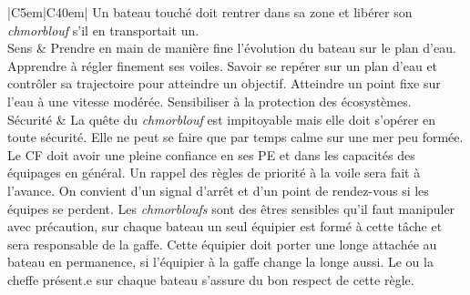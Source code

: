 \begin{center}
\begin{tabular}{|C{5em}|C{40em}|}
Un bateau touché doit rentrer dans sa zone et libérer son \textit{chmorblouf} s'il en transportait un. 
 \\
\hline
Sens & Prendre en main de manière fine l'évolution du bateau sur le plan d'eau. 
Apprendre à régler finement ses voiles. 
Savoir se repérer sur un plan d'eau et contrôler sa trajectoire pour atteindre un objectif. Atteindre un point fixe sur l'eau à une vitesse modérée. 
Sensibiliser à la protection des écosystèmes. \\
\hline
Sécurité & La quête du \textit{chmorblouf} est impitoyable mais elle doit s'opérer en toute sécurité. 
Elle ne peut se faire que par temps calme sur une mer peu formée. 
Le CF doit avoir une pleine confiance en ses PE et dans les capacités des équipages en général. 
Un rappel des règles de priorité à la voile sera fait à l'avance.
On convient d'un signal d'arrêt et d'un point de rendez-vous si les équipes se perdent.  
Les \textit{chmorbloufs} sont des êtres sensibles qu'il faut manipuler avec précaution, sur chaque bateau un seul équipier est formé à cette tâche et sera responsable de la gaffe. 
Cette équipier doit porter une longe attachée au bateau en permanence, si l'équipier à la gaffe change la longe aussi. 
Le ou la cheffe présent.e sur chaque bateau s'assure du bon respect de cette règle.   
\\
\hline
\end{tabular}
\end{center}

\vspace{1cm}
